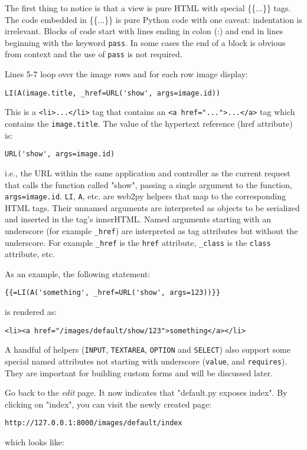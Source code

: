 \documentclass[justified,sixbynine,notoc]{tufte-book}
\def\ft{\small\tt}
\begin{document}
\begin{fullwidth}
The first thing to notice is that a view is pure HTML with special \{\{...\}\} tags. The code embedded in \{\{...\}\} is pure Python code with one caveat: indentation is irrelevant. Blocks of code start with lines ending in colon (:) and end in lines beginning with the keyword {\ft pass}. In some cases the end of a block is obvious from context and the use of {\ft pass} is not required.

Lines 5-7 loop over the image rows and for each row image display:
\begin{lstlisting}
LI(A(image.title, _href=URL('show', args=image.id))
\end{lstlisting}

This is a {\ft <li>...</li>} tag that contains an {\ft <a href="...">...</a>} tag which contains the {\ft image.title}. The value of the hypertext reference (href attribute) is:
\begin{lstlisting}
URL('show', args=image.id)
\end{lstlisting}
\noindent i.e., the URL within the same application and controller as the current request that calls the function called "show", passing a single argument to the function, {\ft args=image.id}.
{\ft LI}, {\ft A}, etc. are web2py helpers that map to the corresponding HTML tags. Their unnamed arguments are interpreted as objects to be serialized and inserted in the tag's innerHTML. Named arguments starting with an underscore (for example {\ft \_href}) are interpreted as tag attributes but without the underscore. For example {\ft \_href} is the {\ft href} attribute, {\ft \_class} is the {\ft class} attribute, etc.

As an example, the following statement:
\begin{lstlisting}[keywords={}]
{{=LI(A('something', _href=URL('show', args=123))}}
\end{lstlisting}
\noindent is rendered as:
\begin{lstlisting}[keywords={}]
<li><a href="/images/default/show/123">something</a></li>
\end{lstlisting}

A handful of helpers ({\ft INPUT}, {\ft TEXTAREA}, {\ft OPTION} and {\ft SELECT}) also support some special named attributes not starting with underscore ({\ft value}, and {\ft requires}). They are important for building custom forms and will be discussed later.

Go back to the {\it edit} page. It now indicates that "default.py exposes index". By clicking on "index", you can visit the newly created page:
\begin{lstlisting}[keywords={}]
http://127.0.0.1:8000/images/default/index
\end{lstlisting}
\noindent which looks like:



\end{fullwidth}
\end{document}

